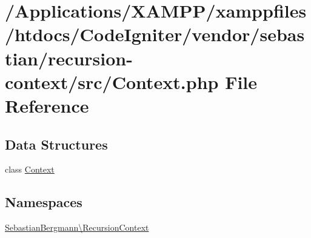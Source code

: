 \hypertarget{sebastian_2recursion-context_2src_2_context_8php}{}\section{/\+Applications/\+X\+A\+M\+P\+P/xamppfiles/htdocs/\+Code\+Igniter/vendor/sebastian/recursion-\/context/src/\+Context.php File Reference}
\label{sebastian_2recursion-context_2src_2_context_8php}
\subsection*{Data Structures}
\begin{DoxyCompactItemize}
\item 
class \mbox{\hyperlink{class_sebastian_bergmann_1_1_recursion_context_1_1_context}{Context}}
\end{DoxyCompactItemize}
\subsection*{Namespaces}
\begin{DoxyCompactItemize}
\item 
 \mbox{\hyperlink{namespace_sebastian_bergmann_1_1_recursion_context}{Sebastian\+Bergmann\textbackslash{}\+Recursion\+Context}}
\end{DoxyCompactItemize}
